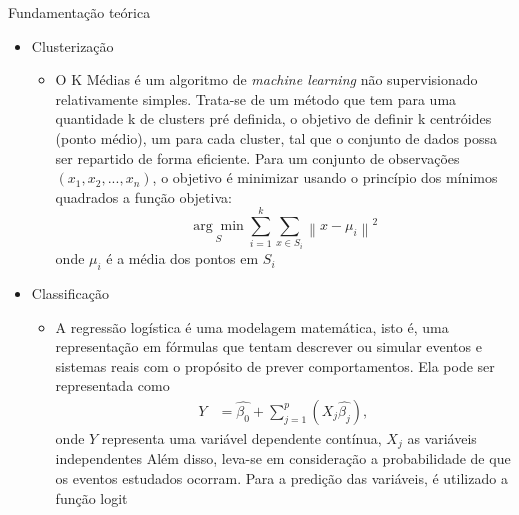 \documentclass[final,hyperref={pdfpagelabels=false}]{beamer}
\begin{document}
\begin{frame}[t]
\begin{columns}[t]
\begin{column}{.465\textwidth}


\begin{block}{Fundamenta\c c\~ao te\'orica}

\begin{itemize}
\item Clusterização
\begin{itemize}
\item O K Médias é um algoritmo de \emph{machine learning} não supervisionado relativamente simples. Trata-se de um método que tem para uma quantidade k de clusters pré definida, o objetivo de definir k centróides (ponto médio), um para cada cluster, tal que o conjunto de dados possa ser repartido de forma eficiente. Para um conjunto de observações \begin{math}(x_{1}, x_{2}, ..., x_{n})\end{math}, o objetivo é minimizar usando o princípio dos mínimos quadrados a função objetiva:
\begin{equation}
\label{eq:media}
\underset{S}{\arg\min} \sum_{i=1}^{k} \sum_{x \in S_{i}}\left \| x - \mu_{i} \right \|^{2}
\end{equation}
onde \begin{math}\mu_{i}\end{math} é a média dos pontos em \begin{math}S_{i}\end{math}

\end{itemize}
\item Classificação
\begin{itemize}
\item A regressão logística é uma modelagem matemática, isto é, uma representação em fórmulas que tentam descrever ou simular eventos e sistemas reais com o propósito de prever comportamentos. Ela pode ser representada como
\begin{equation}
  \label{eq:regressao_linear}
  \begin{aligned}
Y &= \hat{\beta_{0}} + \sum_{j=1}^{p} (X_{j}\hat{\beta_{j}}), 
  \end{aligned}  
\end{equation}
onde \begin{math}Y\end{math} representa uma variável dependente contínua, \begin{math}X_{j}\end{math} as variáveis independentes 
Além disso, leva-se em consideração a probabilidade de que os eventos estudados ocorram. Para a predição das variáveis, é utilizado a função logit


\end{itemize}
\end{itemize}
\end{block}
\end{column}
\end{columns}
\end{frame}
\end{document}
